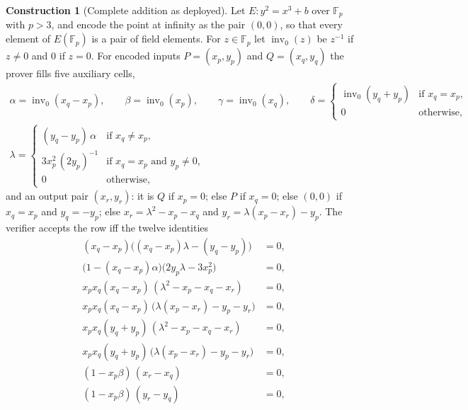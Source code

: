 \documentclass[11pt,a4paper]{article}
\theoremstyle{definition}
\newtheorem{construction}[theorem]{Construction}
\theoremstyle{remark}
\newcommand{\Fp}{\ensuremath{\mathbb{F}_{p}}}
\begin{document}
\begin{construction}[Complete addition as deployed]
\label{ellipticcurves:con-complete}
Let \(E : y^2 = x^3 + b\) over \(\Fp\) with \(p > 3\), and encode the
point at infinity as the pair \((0, 0)\), so that every element of
\(E(\Fp)\) is a pair of field elements. For \(z \in \Fp\) let
\(\operatorname{inv}_0(z)\) be \(z^{-1}\) if \(z \neq 0\) and \(0\) if
\(z = 0\). For encoded inputs \(P = (x_p, y_p)\) and
\(Q = (x_q, y_q)\) the prover fills five auxiliary cells,
\begin{gather*}
  \alpha = \operatorname{inv}_0(x_q - x_p), \qquad
  \beta = \operatorname{inv}_0(x_p), \qquad
  \gamma = \operatorname{inv}_0(x_q), \qquad
  \delta =
  \begin{cases}
    \operatorname{inv}_0(y_q + y_p) & \text{if } x_q = x_p,\\
    0 & \text{otherwise},
  \end{cases}\\[4pt]
  \lambda =
  \begin{cases}
    (y_q - y_p)\,\alpha & \text{if } x_q \neq x_p,\\
    3x_p^2\,(2y_p)^{-1} & \text{if } x_q = x_p \text{ and } y_p \neq 0,\\
    0 & \text{otherwise},
  \end{cases}
\end{gather*}
and an output pair \((x_r, y_r)\): it is \(Q\) if \(x_p = 0\); else
\(P\) if \(x_q = 0\); else \((0, 0)\) if \(x_q = x_p\) and
\(y_q = -y_p\); else \(x_r = \lambda^2 - x_p - x_q\) and
\(y_r = \lambda(x_p - x_r) - y_p\). The verifier accepts the row iff the
twelve identities
\begin{align*}
  (x_q - x_p)\bigl((x_q - x_p)\lambda - (y_q - y_p)\bigr) &= 0,
    \tag{C1}\\
  \bigl(1 - (x_q - x_p)\alpha\bigr)\bigl(2y_p\lambda - 3x_p^2\bigr) &= 0,
    \tag{C2}\\
  x_p x_q (x_q - x_p)\,(\lambda^2 - x_p - x_q - x_r) &= 0,
    \tag{C3a}\\
  x_p x_q (x_q - x_p)\,\bigl(\lambda(x_p - x_r) - y_p - y_r\bigr) &= 0,
    \tag{C3b}\\
  x_p x_q (y_q + y_p)\,(\lambda^2 - x_p - x_q - x_r) &= 0,
    \tag{C3c}\\
  x_p x_q (y_q + y_p)\,\bigl(\lambda(x_p - x_r) - y_p - y_r\bigr) &= 0,
    \tag{C3d}\\
  (1 - x_p\beta)\,(x_r - x_q) &= 0,
    \tag{C4a}\\
  (1 - x_p\beta)\,(y_r - y_q) &= 0,

\end{align*}
\end{construction}
\end{document}
